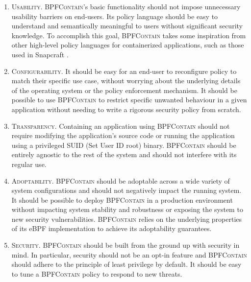 \documentclass[dvipsnames, 12pt]{article}
\def\bpfcontain{\textsc{BPFContain}}
\begin{document}
\begin{enumerate}[label=\bfseries D\arabic*., ref=D\arabic*, labelindent=1em]
  \item \label{d:1} \textsc{Usability.}
    \bpfcontain{}'s basic functionality should not impose unnecessary usability
    barriers on end-users.  Its policy language should be easy to understand and
    semantically meaningful to users without significant security knowledge. To
    accomplish this goal, \bpfcontain{} takes some inspiration from other high-level
    policy languages for containerized applications, such as those used in
    Snapcraft \cite{snap}.

  \item \label{d:2} \textsc{Configurability.}
    It should be easy for an end-user to reconfigure policy to match their
    specific use case, without worrying about the underlying details of the
    operating system or the policy enforcement mechanism. It should be possible
    to use \bpfcontain{} to restrict specific unwanted behaviour in a given
    application without needing to write a rigorous security policy from
    scratch.

  \item \label{d:3} \textsc{Transparency.}
    Containing an application using \bpfcontain{} should not require modifying the
    application's source code or running the application using a privileged SUID
    (Set User ID root) binary. \bpfcontain{} should be entirely agnostic to the rest
    of the system and should not interfere with its regular use.

  \item \label{d:4} \textsc{Adoptability.}
    \bpfcontain{} should be adoptable across a wide variety of system configurations
    and should not negatively impact the running system. It should be possible
    to deploy \bpfcontain{} in a production environment without impacting system
    stability and robustness or exposing the system to new security
    vulnerabilities. \bpfcontain{} relies on the underlying properties of its eBPF
    implementation to achieve its adoptability guarantees.

  \item \label{d:5} \textsc{Security.}
    \bpfcontain{} should be built from the ground up with security in mind. In
    particular, security should not be an opt-in feature and \bpfcontain{} should
    adhere to the principle of least privilege \cite{saltzer1975_protection} by
    default. It should be easy to tune a \bpfcontain{} policy to respond to new
    threats.
\end{enumerate}
\end{document}

